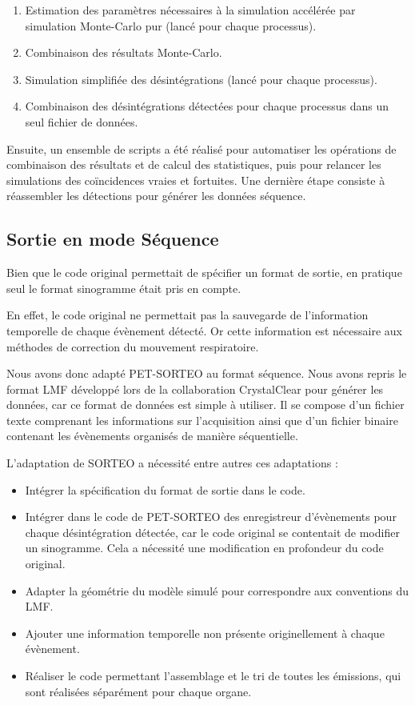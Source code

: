     \begin{enumerate}
        \item Estimation des paramètres nécessaires à la simulation accélérée par simulation Monte-Carlo pur (lancé pour chaque processus).
        \item Combinaison des résultats Monte-Carlo.
        \item Simulation simplifiée des désintégrations (lancé pour chaque processus).
        \item Combinaison des désintégrations détectées pour chaque processus dans un seul fichier de données.
    \end{enumerate}

Ensuite, un ensemble de scripts a été réalisé pour automatiser les opérations de combinaison des résultats et de calcul des statistiques, puis pour relancer les simulations des coïncidences vraies et fortuites. Une dernière étape consiste à réassembler les détections pour générer les données séquence.

\subsection{Sortie en mode Séquence}

Bien que le code original permettait de spécifier un format de sortie, en pratique seul le format sinogramme était pris en compte. 

En effet, le code original ne permettait pas la sauvegarde de l'information temporelle de chaque évènement détecté. Or cette information est nécessaire aux méthodes de correction du mouvement respiratoire. 

Nous avons donc adapté PET-SORTEO au format séquence. Nous avons repris le format LMF développé lors de la collaboration CrystalClear pour générer les données, car ce format de données est simple à utiliser. Il se compose d'un fichier texte comprenant les informations sur l'acquisition ainsi que d'un fichier binaire contenant les évènements organisés de manière séquentielle.

 L'adaptation de SORTEO a nécessité entre autres ces adaptations :

\begin{itemize}
\item Intégrer la spécification du format de sortie dans le code.
\item Intégrer dans le code de PET-SORTEO des enregistreur d'évènements pour chaque désintégration détectée, car le code original se contentait de modifier un sinogramme. Cela a nécessité une modification en profondeur du code original.
\item Adapter la géométrie du modèle simulé pour correspondre aux conventions du LMF.
\item Ajouter une information temporelle non présente originellement à chaque évènement.
\item Réaliser le code permettant l'assemblage et le tri de toutes les émissions, qui sont réalisées séparément pour chaque organe.
\end{itemize}


